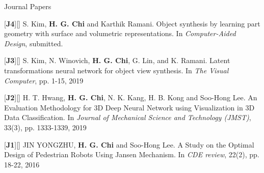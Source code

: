 


\begin{cventries}

\cvpub
{Journal Papers} %
{ %
\begin{cvitems}
\item {[\textbf{J4}][\href{https://docs.google.com/viewer?url=https://github.com/stnoah1/CV/raw/master/documents/CAD.pdf}{}] S. Kim, \textbf{H. G. Chi} and Karthik Ramani. Object synthesis by learning part geometry with surface and volumetric representations. In \textit{Computer-Aided Design}, submitted.}
\item {[\textbf{J3}][\href{https://link.springer.com/article/10.1007/s00371-019-01755-x}{}] S. Kim, N. Winovich, \textbf{H. G. Chi}, G. Lin, and K. Ramani. Latent transformations neural network for object view synthesis. In \textit{The Visual Computer}, pp. 1-15, 2019}
\item {[\textbf{J2}][\href{https://link.springer.com/content/pdf/10.1007/s12206-019-0233-1.pdf}{}] H. T. Hwang, \textbf{H. G. Chi}, N. K. Kang, H. B. Kong and Soo-Hong Lee. An Evaluation Methodology for 3D Deep Neural Network using Visualization in 3D Data Classification. In \textit{Journal of Mechanical Science and Technology (JMST)}, 33(3), pp. 1333-1339, 2019}
\item {[\textbf{J1}][\href{https://docs.google.com/`vi'ewer?url=https://github.com/stnoah1/CV/raw/master/documents/Edison.pdf}{}] JIN YONGZHU, \textbf{H. G. Chi} and Soo-Hong Lee. A Study on the Optimal Design of Pedestrian Robots Using Jansen Mechanism. In \textit{CDE review}, 22(2), pp. 18-22, 2016}
\end{cvitems}
}


\end{cventries}
